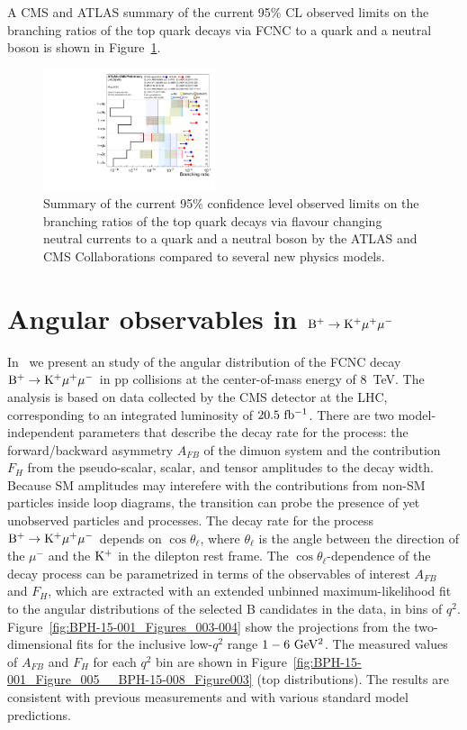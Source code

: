 \documentclass{PoS}
\begin{document}
A CMS and ATLAS summary of the current 95\% CL observed limits on the branching
ratios of the top quark decays via FCNC to a quark and a neutral boson is shown
in Figure~\ref{fig:fcnc_summarybsm_may18}.

\begin{figure}[htb]
\centering
\includegraphics[width=0.45\textwidth]{figures/fcnc_summarybsm_may18}
\caption{
  Summary of the current 95\% confidence level observed limits on the branching
  ratios of the top quark decays via flavour changing neutral currents to a
  quark and a neutral boson by the ATLAS and CMS Collaborations compared to
  several new physics models. 
}
\label{fig:fcnc_summarybsm_may18}
\end{figure}


\section{Angular observables in ${\rm B^+ \to K^+\mu^+\mu^-}$}

In~\cite{bph-15-001} we present an study of the angular distribution of the FCNC
decay ${\rm B^+ \to K^+\mu^+\mu^-}$ in pp collisions at the center-of-mass
energy of 8~TeV. The analysis is based on data collected by the CMS detector at
the LHC, corresponding to an integrated luminosity of ${\rm 20.5~fb^{-1}}$.
There are two model-independent parameters that describe the decay rate for the
process: the forward/backward asymmetry $A_{FB}$ of the dimuon system and the
contribution $F_H$ from the pseudo-scalar, scalar, and tensor amplitudes to the
decay width. Because SM amplitudes may interefere with the contributions from
non-SM particles inside loop diagrams, the transition can probe the presence of
yet unobserved particles and processes.
The decay rate for the process ${\rm B^+ \to K^+\mu^+\mu^-}$ depends on
$\cos\theta_{\ell}$, where $\theta_{\ell}$ is the angle between the direction
of the $\mu^-$ and the ${\rm K^+}$ in the dilepton rest frame. The
$\cos\theta_{\ell}$-dependence of the decay process can be parametrized in
terms of the observables of interest $A_{FB}$ and $F_H$, which are extracted
with an extended unbinned maximum-likelihood fit to the angular distributions
of the selected B candidates in the data, in bins of $q^2$.
Figure~\ref{fig:BPH-15-001_Figures_003-004} show the projections from the
two-dimensional fits for the inclusive low-$q^2$ range ${\rm 1-6~GeV^2}$.
The measured values of $A_{FB}$ and $F_H$ for each $q^2$ bin are shown in
Figure~\ref{fig:BPH-15-001_Figure_005__BPH-15-008_Figure003}
(top distributions). The results are consistent with previous measurements and
with various standard model predictions.
\end{document}
